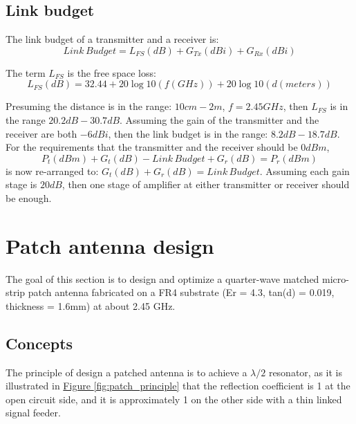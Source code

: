 \documentclass[12pt,a4paper]{report}
\begin{document}
\section{Link budget}
The link budget of a transmitter and a receiver is:
\begin{equation}
    Link \, Budget = L_{FS}(dB) + G_{Tx}(dBi) + G_{Rx}(dBi)
\end{equation}

The term $L_{FS}$ is the free space loss:
\begin{equation}
    L_{FS}(dB) = 32.44 + 20\log{10}{(f(GHz))} + 20\log{10}{(d(meters))}
\end{equation}

Presuming the distance is in the range: $10cm - 2m$, $f = 2.45GHz$, then $L_{FS}$ is in the range $20.2dB - 30.7dB$.
Assuming the gain of the transmitter and the receiver are both $-6dBi$, then the link budget is in the range: $8.2dB - 18.7dB$.
For the requirements that the transmitter and the receiver should be $0dBm$,
\begin{equation}
    P_t(dBm) + G_t(dB) - Link \, Budget + G_r(dB) = P_r(dBm)
\end{equation}
is now re-arranged to: $G_t(dB) + G_r(dB) = Link \, Budget$. Assuming each gain stage is $20dB$, then one stage of amplifier at either transmitter or receiver should be enough.

\chapter{Patch antenna design}
The goal of this section is to design and optimize a quarter-wave matched micro-strip patch antenna fabricated on a FR4 substrate (Er = 4.3, tan(d) = 0.019, thickness = 1.6mm) at about 2.45 GHz.

\section{Concepts}
The principle of design a patched antenna is to achieve a $\lambda / 2$ resonator, as it is illustrated in \hyperref[fig:patch_principle]{Figure \ref*{fig:patch_principle}} that the reflection coefficient is 1 at the open circuit side, and it is approximately 1 on the other side with a thin linked signal feeder.
\end{document}
